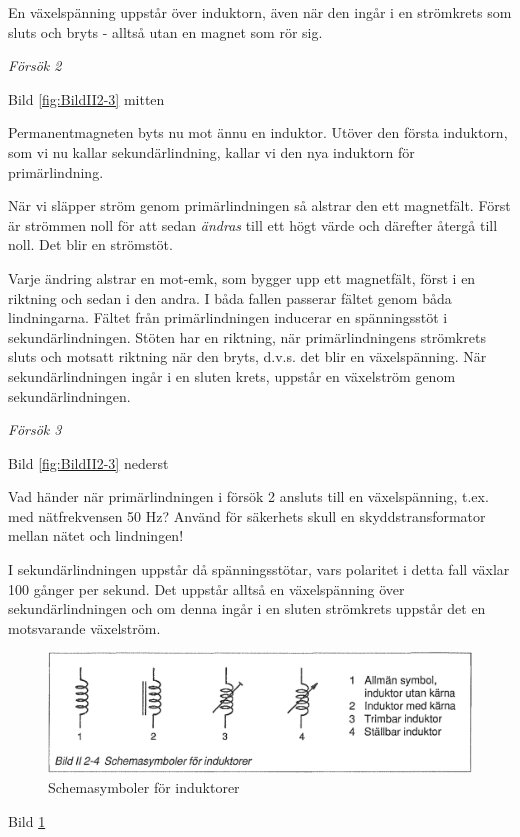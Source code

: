 En växelspänning uppstår över induktorn, även när den ingår i en strömkrets som
sluts och bryts - alltså utan en magnet som rör sig.

\emph{Försök 2}

Bild \ref{fig:BildII2-3} mitten

Permanentmagneten byts nu mot ännu en induktor. Utöver den första induktorn, som
vi nu kallar sekundärlindning, kallar vi den nya induktorn för primärlindning.

När vi släpper ström genom primärlindningen så alstrar den ett magnetfält. Först
är strömmen noll för att sedan \emph{ändras} till ett högt värde och därefter
återgå till noll. Det blir en strömstöt.

Varje ändring alstrar en mot-emk, som bygger upp ett magnetfält, först i en
riktning och sedan i den andra. I båda fallen passerar fältet genom båda
lindningarna. Fältet från primärlindningen inducerar en spänningsstöt i
sekundärlindningen. Stöten har en riktning, när primärlindningens strömkrets
sluts och motsatt riktning när den bryts, d.v.s. det blir en växelspänning.
När sekundärlindningen ingår i en sluten krets, uppstår en växelström genom
sekundärlindningen.

\emph{Försök 3}


Bild \ref{fig:BildII2-3} nederst

Vad händer när primärlindningen i försök 2 ansluts till en växelspänning, t.ex.
med nätfrekvensen 50 Hz? Använd för säkerhets skull en skyddstransformator
mellan nätet och lindningen!

I sekundärlindningen uppstår då spänningsstötar, vars polaritet i detta fall
växlar 100 gånger per sekund. Det uppstår alltså en växelspänning över
sekundärlindningen och om denna ingår i en sluten strömkrets uppstår det en
motsvarande växelström.


\begin{figure}
\includegraphics[width=\textwidth]{images/bild_2_2-04}
\caption{Schemasymboler för induktorer}
\label{fig:BildII2-4}
\end{figure}

Bild \ref{fig:BildII2-4}

